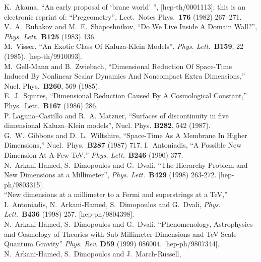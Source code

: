 \documentclass[a4paper,10pt]{article}
\begin{document}
\begin{thebibliography}{99}%
K.~Akama,
``An early proposal of `brane world' '',
[hep-th/0001113];
this is an electronic reprint of: ``Pregeometry'',
Lect.\ Notes Phys.\  {\bf 176} (1982) 267--271.
\\
V.~A.~Rubakov and M.~E.~Shaposhnikov,
``Do We Live Inside A Domain Wall?'',
{\it Phys.  Lett.}\  {\bf B125} (1983) 136.
\\
M.~Visser,
``An Exotic Class Of Kaluza-Klein Models'',
{\it Phys.  Lett.}\  {\bf B159}, 22 (1985).
[hep-th/9910093].
\\
M.~Gell-Mann and B.~Zwiebach,
``Dimensional Reduction Of Space-Time Induced By Nonlinear Scalar Dynamics 
And Noncompact Extra Dimensions,''
Nucl.  Phys.\  {\bf B260}, 569 (1985).
\\
E.~J.~Squires,
``Dimensional Reduction Caused By A Cosmological Constant,''
Phys.\ Lett.\  {\bf B167} (1986) 286.
\\
P. Laguna--Castillo and R.~A. Matzner,
``Surfaces of discontinuity in five dimensional Kaluza--Klein models'',
Nucl. Phys. {\bf B282}, 542 (1987).
\\
G.~W.~Gibbons and D.~L.~Wiltshire,
``Space-Time As A Membrane In Higher Dimensions,''
Nucl.\ Phys.\  {\bf B287} (1987) 717.
I.~Antoniadis, 
``A Possible New Dimension At A Few TeV,''
{\it Phys.  Lett.}\ {\bf B246} (1990) 377.
\\
N.~Arkani-Hamed, S.~Dimopoulos and G.~Dvali,
``The Hierarchy Problem and New Dimensions at a Millimeter'',
{\it Phys.   Lett.}\ {\bf B429} (1998) 263-272.
[hep-ph/9803315].
\\
``New dimensions at a millimeter to a Fermi and superstrings at a TeV,''
I.~Antoniadis, N.~Arkani-Hamed, S.~Dimopoulos and G.~Dvali,
{\it Phys.  Lett.}\ {\bf B436} (1998) 257. 
[hep-ph/9804398].
\\
N.~Arkani-Hamed, S.~Dimopoulos and G.~Dvali,
``Phenomenology, Astrophysics and Cosmology of Theories with 
Sub-Millimeter Dimensions and TeV Scale Quantum Gravity''
{\it Phys.  Rev.} {\bf D59} (1999) 086004.
[hep-ph/9807344].
\\
N.~Arkani-Hamed, S.~Dimopoulos and J.~March-Russell,

\end{thebibliography}
\end{document}
